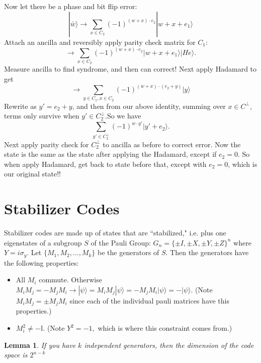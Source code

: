 \documentclass[12pt]{article}
\newtheorem{lemma}[theorem]{Lemma}
\begin{document}
Now let there be a phase and bit flip error:
$$|\bar{w}\rangle\rightarrow\sum_{x\in C_2}(-1)^{(w+x)\cdot e_2}|w+x+e_1\rangle$$
Attach an ancilla and reversibly apply parity check matrix for $C_1$:
$$\rightarrow\sum_{x\in C_2}(-1)^{(w+x)\cdot e_2}|w+x+e_1\rangle|He\rangle.$$
Measure ancilla to find syndrome, and then can correct! Next apply Hadamard to get
$$\rightarrow\sum_{y\in C_1,x\in C_2}(-1)^{(w+x)\cdot( e_2 + y)}|y\rangle$$
Rewrite as $y'=e_2+y$, and then 
from our above identity, summing over $x\in C^\bot$, terms only survive when $y'\in C_2^\bot$.So we have
$$\sum_{y'\in C_2^\bot}(-1)^{w\cdot y'}|y'+e_2\rangle.$$
Next apply parity check for $C_2^\bot$ to ancilla as before to correct error. Now the state is the same as the state after applying the Hadamard, except 
if $e_2=0$. So when apply Hadamard, get back to state before that, except with $e_2=0$, which is our original state!!


\section{Stabilizer Codes}

Stabilizer codes are made up of states that are ``stabilized," i.e. plus one eigenstates of a subgroup $S$ of the Pauli Group: $G_n=\{\pm I, \pm X, \pm Y, \pm Z\}^n$ where $Y=i\sigma_y$. 
Let $\{M_1, M_2,\dots,M_k\}$ be the generators of $S$. Then the generators have the following properties:
\begin{itemize}
\item All $M_i$ commute. Otherwise $M_iM_j=-M_jM_i\rightarrow |\psi\rangle=M_iM_j|\psi\rangle=-M_jM_i|\psi\rangle=-|\psi\rangle$. (Note $M_iM_j=\pm M_jM_i$ since each of the individual pauli matrices have this properties.)
\item $M_i^2\neq -\mathbb{I}$. (Note $Y^2=-1,$ which is where this constraint comes from.)

\end{itemize}

\begin{lemma}
If you have $k$ independent generators, then the dimension of the code space is $2^{n-k}$
\end{lemma}
\end{document}

